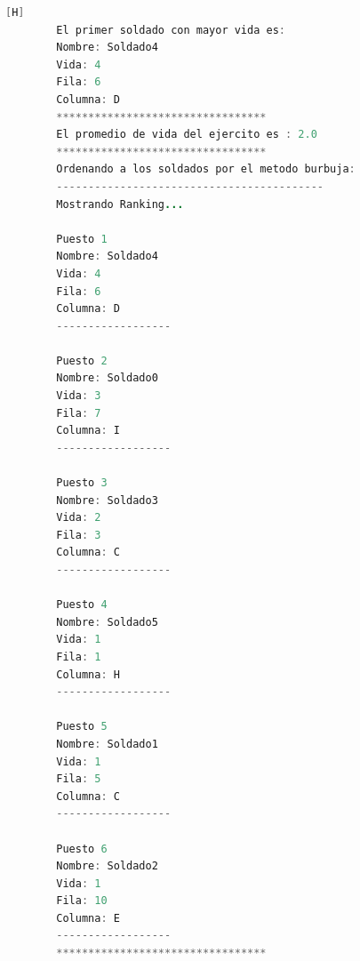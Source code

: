 \documentclass{article}
\begin{document}
\begin{lstlisting}[language=java,caption={Las lineas de codigos del metodo creado: \textcolor{red}{VER EL TEXTO EN LATEX EN LA IMAGEN SE DEFORMA O EJECUTARLO}}][H]
		El primer soldado con mayor vida es: 
		Nombre: Soldado4
		Vida: 4
		Fila: 6
		Columna: D
		*********************************
		El promedio de vida del ejercito es : 2.0
		*********************************
		Ordenando a los soldados por el metodo burbuja: 
		------------------------------------------
		Mostrando Ranking...

		Puesto 1
		Nombre: Soldado4
		Vida: 4
		Fila: 6
		Columna: D
		------------------

		Puesto 2
		Nombre: Soldado0
		Vida: 3
		Fila: 7
		Columna: I
		------------------

		Puesto 3
		Nombre: Soldado3
		Vida: 2
		Fila: 3
		Columna: C
		------------------

		Puesto 4
		Nombre: Soldado5
		Vida: 1
		Fila: 1
		Columna: H
		------------------

		Puesto 5
		Nombre: Soldado1
		Vida: 1
		Fila: 5
		Columna: C
		------------------

		Puesto 6
		Nombre: Soldado2
		Vida: 1
		Fila: 10
		Columna: E
		------------------
		*********************************
		
	\end{lstlisting}
\end{document}
